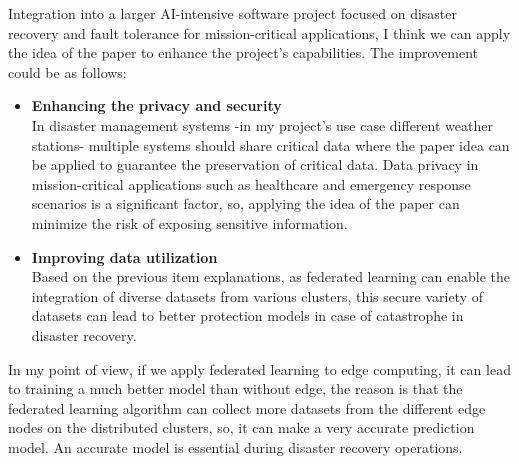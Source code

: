 \documentclass{article}
\begin{document}
Integration into a larger AI-intensive software project focused on disaster recovery and fault tolerance for mission-critical applications, I think we can apply the idea of the paper to enhance the project's capabilities. The improvement could be as follows:
\begin{itemize}
    \item \textbf{Enhancing the privacy and security}\\
    In disaster management systems -in my project's use case different weather stations- multiple systems should share critical data where the paper idea can be applied to guarantee the preservation of critical data. Data privacy in mission-critical applications such as healthcare and emergency response scenarios is a significant factor, so, applying the idea of the paper can minimize the risk of exposing sensitive information.
    \item \textbf{Improving data utilization} \\
    Based on the previous item explanations, as federated learning can enable the integration of diverse datasets from various clusters, this secure variety of datasets can lead to better protection models in case of catastrophe in disaster recovery.
\end{itemize}

In my point of view, if we apply federated learning to edge computing, it can lead to training a much better model than without edge, the reason is that the federated learning algorithm can collect more datasets from the different edge nodes on the distributed clusters, so, it can make a very accurate prediction model. An accurate model is essential during disaster recovery operations.




\end{document}
